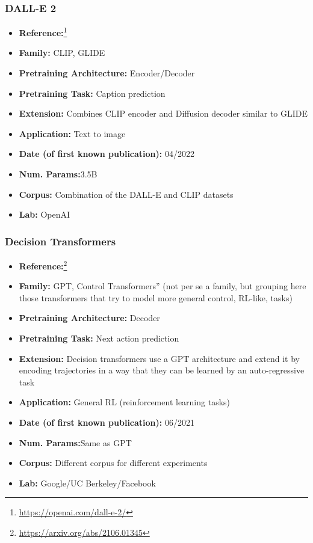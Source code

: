 \documentclass{article}
\begin{document}
\subsubsection{DALL-E 2}

            \begin{itemize}
                \item \textbf{Reference:}\footnote{\url{https://openai.com/dall-e-2/}}\cite{ramesh2022hierarchical}
                \item \textbf{Family:} CLIP, GLIDE 
                \item \textbf{Pretraining Architecture:} Encoder/Decoder
                \item \textbf{Pretraining Task:} Caption prediction
                \item \textbf{Extension:} Combines CLIP encoder and Diffusion decoder similar to GLIDE  
                \item \textbf{Application:} Text to image
                \item \textbf{Date (of first known publication):} 04/2022
                \item \textbf{Num. Params:}3.5B
                \item \textbf{Corpus:} Combination of the DALL-E and CLIP datasets
                \item \textbf{Lab:} OpenAI
            \end{itemize}

\subsubsection{Decision Transformers}

            \begin{itemize}
                \item \textbf{Reference:}\footnote{\url{https://arxiv.org/abs/2106.01345}}\cite{chen2021decision}
                \item \textbf{Family:} GPT, Control Transformers” (not per se a family, but grouping here those transformers that try to model more general control, RL-like, tasks) 
                \item \textbf{Pretraining Architecture:} Decoder
                \item \textbf{Pretraining Task:} Next action prediction
                \item \textbf{Extension:} Decision transformers use a GPT architecture and extend it by encoding trajectories in a way that they can be learned by an auto-regressive task  
                \item \textbf{Application:} General RL (reinforcement learning tasks)
                \item \textbf{Date (of first known publication):} 06/2021
                \item \textbf{Num. Params:}Same as GPT
                \item \textbf{Corpus:} Different corpus for different experiments
                \item \textbf{Lab:} Google/UC Berkeley/Facebook
            \end{itemize}
\end{document}
